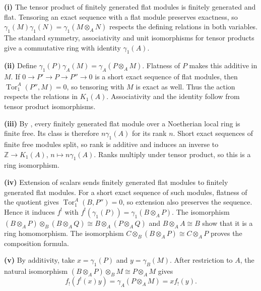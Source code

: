 \textbf{(i)} The tensor product of finitely generated flat modules is finitely generated and flat. Tensoring an exact sequence with a flat module preserves exactness, so $\gamma_1(M)\gamma_1(N)=\gamma_1(M\otimes_A N)$ respects the defining relations in both variables. The standard symmetry, associativity and unit isomorphisms for tensor products give a commutative ring with identity $\gamma_1(A)$.

\textbf{(ii)} Define $\gamma_1(P)\gamma_A(M)=\gamma_A(P\otimes_A M)$. Flatness of $P$ makes this additive in $M$. If $0\to P'\to P\to P''\to0$ is a short exact sequence of flat modules, then $\operatorname{Tor}_1^A(P'',M)=0$, so tensoring with $M$ is exact as well. Thus the action respects the relations in $K_1(A)$. Associativity and the identity follow from tensor product isomorphisms.

\textbf{(iii)} By , every finitely generated flat module over a Noetherian local ring is finite free. Its class is therefore $n\gamma_1(A)$ for its rank $n$. Short exact sequences of finite free modules split, so rank is additive and induces an inverse to $\mathbb{Z}\to K_1(A)$, $n\mapsto n\gamma_1(A)$. Ranks multiply under tensor product, so this is a ring isomorphism.

\textbf{(iv)} Extension of scalars sends finitely generated flat modules to finitely generated flat modules. For a short exact sequence of such modules, flatness of the quotient gives $\operatorname{Tor}_1^A(B,P'')=0$, so extension also preserves the sequence. Hence it induces $f^!$ with $f^!(\gamma_1(P))=\gamma_1(B\otimes_A P)$. The isomorphism $(B\otimes_A P)\otimes_B(B\otimes_A Q)\cong B\otimes_A(P\otimes_A Q)$ and $B\otimes_A A\cong B$ show that it is a ring homomorphism. The isomorphism $C\otimes_B(B\otimes_A P)\cong C\otimes_A P$ proves the composition formula.

\textbf{(v)} By additivity, take $x=\gamma_1(P)$ and $y=\gamma_B(M)$. After restriction to $A$, the natural isomorphism $(B\otimes_A P)\otimes_B M\cong P\otimes_A M$ gives
\[f_!(f^!(x)y)=\gamma_A(P\otimes_A M)=xf_!(y).\]
